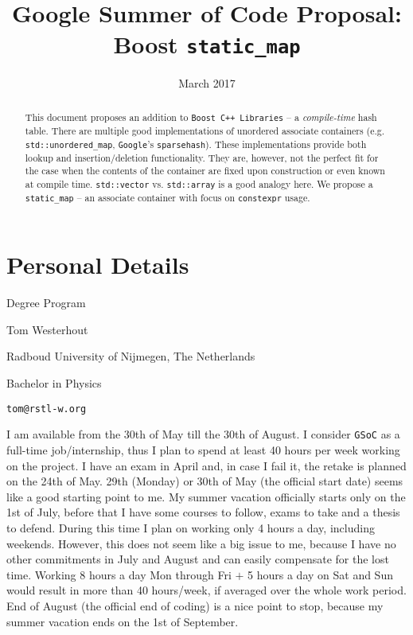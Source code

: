 \documentclass[a4paper,12pt]{article}
\title{Google Summer of Code Proposal: Boost \texttt{static\_map}}
\date{March 2017}
\begin{document}
\maketitle

\begin{abstract}
    This document proposes an addition to \texttt{Boost C++ Libraries} -- a \textit{compile-time} hash table. There are multiple good implementations of unordered associate containers (e.g. \texttt{std::unordered\_map}, \texttt{Google}'s \texttt{sparsehash}). These implementations provide both lookup and insertion/deletion functionality. They are, however, not the perfect fit for the case when the contents of the container are fixed upon construction or even known at compile time. \texttt{std::vector} vs. \texttt{std::array} is a good analogy here. We propose a \texttt{static\_map} -- an associate container with focus on \texttt{constexpr} usage.
\end{abstract}

\section{Personal Details}
    \begin{labeling}{Degree Program}
    \item [Name] Tom Westerhout
    \item [University] Radboud University of Nijmegen, The Netherlands
    \item [Degree Program] Bachelor in Physics
    \item [Email] \texttt{tom@rstl-w.org}
    \item [Availability] I am available from the 30th of May till the 30th of August. I consider \texttt{GSoC} as a full-time job/internship, thus I plan to spend at least 40 hours per week working on the project. I have an exam in April and, in case I fail it, the retake is planned on the 24th of May. 29th (Monday) or 30th of May (the official start date) seems like a good starting point to me. My summer vacation officially starts only on the 1st of July, before that I have some courses to follow, exams to take and a thesis to defend. During this time I plan on working only 4 hours a day, including weekends. However, this does not seem like a big issue to me, because I have no other commitments in July and August and can easily compensate for the lost time. Working 8 hours a day Mon through Fri $+$ 5 hours a day on Sat and Sun would result in more than 40 hours/week, if averaged over the whole work period. End of August (the official end of coding) is a nice point to stop, because my summer vacation ends on the 1st of September.
    \end{labeling}
\end{document}
